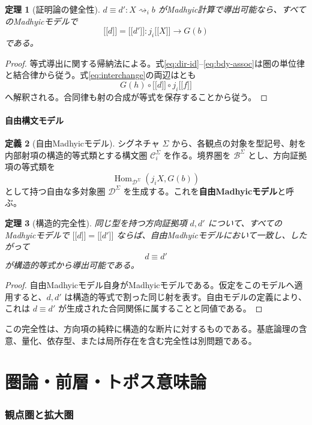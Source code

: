 \documentclass[a4paper,11pt]{ltjsarticle}
\theoremstyle{definition}
\newtheorem{definition}{定義}[section]
\theoremstyle{plain}
\newtheorem{theorem}[definition]{定理}
\newcommand{\Hom}{\operatorname{Hom}}
\newcommand{\Bdy}{\mathcal B}
\newcommand{\DEq}{\equiv}
\newcommand{\sem}[1]{\mathopen{[\![}#1\mathclose{]\!]}}
\begin{document}
\begin{theorem}[証明論の健全性]
$d\DEq d':X\rightsquigarrow_i b$ がMadhyic計算で導出可能なら、すべてのMadhyicモデルで
\[
 \sem d=\sem{d'}:
 j_i\sem X\longrightarrow G(b)
\]
である。
\end{theorem}

\begin{proof}
等式導出に関する帰納法による。式\eqref{eq:dir-id}--\eqref{eq:bdy-assoc}は圏の単位律と結合律から従う。式\eqref{eq:interchange}の両辺はとも
\[
 G(h)\circ\sem d\circ j_i\sem f
\]
へ解釈される。合同律も射の合成が等式を保存することから従う。
\end{proof}

\subsection{自由構文モデル}

\begin{definition}[自由Madhyicモデル]
シグネチャ $\Sigma$ から、各観点の対象を型記号、射を内部射項の構造的等式類とする構文圏 $\mathcal C_i^\Sigma$ を作る。境界圏を $\Bdy^\Sigma$ とし、方向証拠項の等式類を
\[
 \Hom_{\mathcal D^\Sigma}
 (j_iX,G(b))
\]
として持つ自由な多対象圏 $\mathcal D^\Sigma$ を生成する。これを\textbf{自由Madhyicモデル}と呼ぶ。
\end{definition}

\begin{theorem}[構造的完全性]
同じ型を持つ方向証拠項 $d,d'$ について、すべてのMadhyicモデルで $\sem d=\sem{d'}$ ならば、自由Madhyicモデルにおいて一致し、したがって
\[
 d\DEq d'
\]
が構造的等式から導出可能である。
\end{theorem}

\begin{proof}
自由Madhyicモデル自身がMadhyicモデルである。仮定をこのモデルへ適用すると、$d,d'$ は構造的等式で割った同じ射を表す。自由モデルの定義により、これは $d\DEq d'$ が生成された合同関係に属することと同値である。
\end{proof}

この完全性は、方向項の純粋に構造的な断片に対するものである。基底論理の含意、量化、依存型、または局所存在を含む完全性は別問題である。

\part{圏論・前層・トポス意味論}

\section{観点圏と拡大圏}
\end{document}
